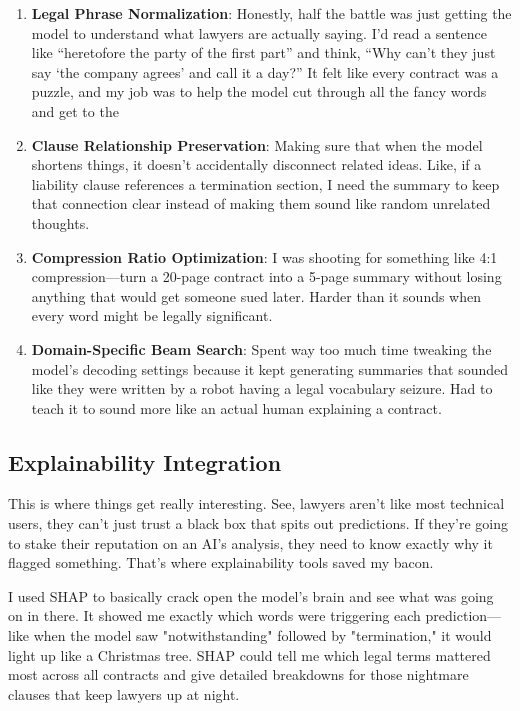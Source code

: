 \begin{enumerate}
    \item \textbf{Legal Phrase Normalization}: Honestly, half the battle was just getting the model to understand what lawyers are actually saying. I’d read a sentence like “heretofore the party of the first part” and think, “Why can’t they just say ‘the company agrees’ and call it a day?” It felt like every contract was a puzzle, and my job was to help the model cut through all the fancy words and get to the
    \item \textbf{Clause Relationship Preservation}: Making sure that when the model shortens things, it doesn't accidentally disconnect related ideas. Like, if a liability clause references a termination section, I need the summary to keep that connection clear instead of making them sound like random unrelated thoughts.
    \item \textbf{Compression Ratio Optimization}: I was shooting for something like 4:1 compression—turn a 20-page contract into a 5-page summary without losing anything that would get someone sued later. Harder than it sounds when every word might be legally significant.
    \item \textbf{Domain-Specific Beam Search}: Spent way too much time tweaking the model's decoding settings because it kept generating summaries that sounded like they were written by a robot having a legal vocabulary seizure. Had to teach it to sound more like an actual human explaining a contract.
\end{enumerate}

\subsection{Explainability Integration}

This is where things get really interesting. See, lawyers aren't like most technical users, they can't just trust a black box that spits out predictions. If they're going to stake their reputation on an AI's analysis, they need to know exactly why it flagged something. That's where explainability tools saved my bacon.

I used SHAP \cite{lundberg2017unified} to basically crack open the model's brain and see what was going on in there. It showed me exactly which words were triggering each prediction—like when the model saw "notwithstanding" followed by "termination," it would light up like a Christmas tree. SHAP could tell me which legal terms mattered most across all contracts and give detailed breakdowns for those nightmare clauses that keep lawyers up at night. 

